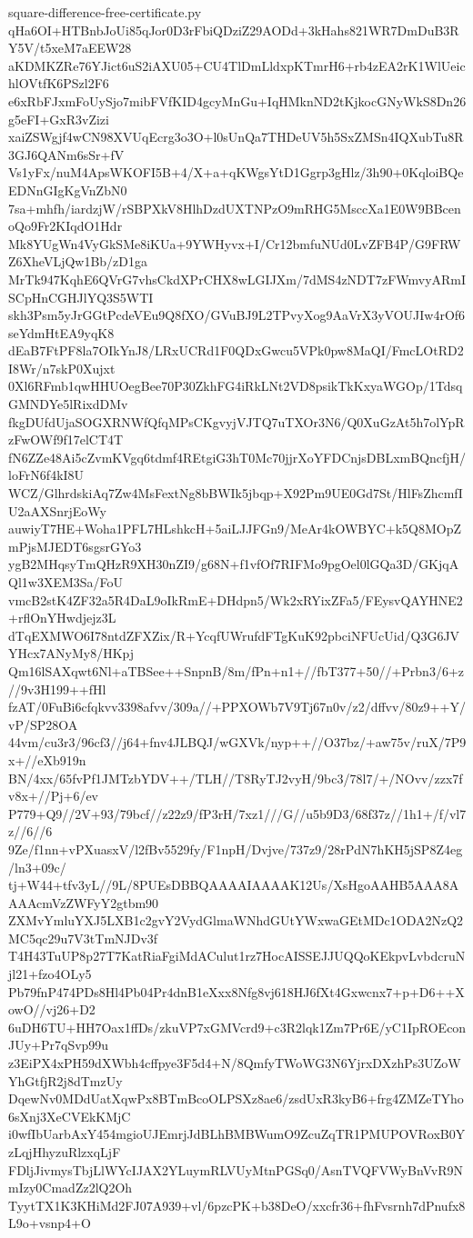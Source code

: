 \documentclass[11pt]{article}
\theoremstyle{definition}
\theoremstyle{remark}
\begin{document}
\begin{filecontents*}[overwrite]{square-difference-free-certificate.py}
qHa6OI+HTBnbJoUi85qJor0D3rFbiQDziZ29AODd+3kHahs821WR7DmDuB3RY5V/t5xeM7aEEW28
aKDMKZRe76YJict6uS2iAXU05+CU4TlDmLldxpKTmrH6+rb4zEA2rK1WlUeichlOVtfK6PSzl2F6
e6xRbFJxmFoUySjo7mibFVfKID4gcyMnGu+IqHMknND2tKjkocGNyWkS8Dn26g5eFI+GxR3vZizi
xaiZSWgjf4wCN98XVUqEcrg3o3O+l0sUnQa7THDeUV5h5SxZMSn4IQXubTu8R3GJ6QANm6sSr+fV
Vs1yFx/nuM4ApsWKOFI5B+4/X+a+qKWgsYtD1Ggrp3gHlz/3h90+0KqloiBQeEDNnGIgKgVnZbN0
7sa+mhfh/iardzjW/rSBPXkV8HlhDzdUXTNPzO9mRHG5MsccXa1E0W9BBcenoQo9Fr2KIqdO1Hdr
Mk8YUgWn4VyGkSMe8iKUa+9YWHyvx+I/Cr12bmfuNUd0LvZFB4P/G9FRWZ6XheVLjQw1Bb/zD1ga
MrTk947KqhE6QVrG7vhsCkdXPrCHX8wLGIJXm/7dMS4zNDT7zFWmvyARmISCpHnCGHJlYQ3S5WTI
skh3Psm5yJrGGtPcdeVEu9Q8fXO/GVuBJ9L2TPvyXog9AaVrX3yVOUJIw4rOf6seYdmHtEA9yqK8
dEaB7FtPF8la7OIkYnJ8/LRxUCRd1F0QDxGwcu5VPk0pw8MaQI/FmcLOtRD2I8Wr/n7skP0Xujxt
0Xl6RFmb1qwHHUOegBee70P30ZkhFG4iRkLNt2VD8psikTkKxyaWGOp/1TdsqGMNDYe5lRixdDMv
fkgDUfdUjaSOGXRNWfQfqMPsCKgvyjVJTQ7uTXOr3N6/Q0XuGzAt5h7olYpRzFwOWf9f17elCT4T
fN6ZZe48Ai5cZvmKVgq6tdmf4REtgiG3hT0Mc70jjrXoYFDCnjsDBLxmBQncfjH/loFrN6f4kI8U
WCZ/GlhrdskiAq7Zw4MsFextNg8bBWIk5jbqp+X92Pm9UE0Gd7St/HlFsZhcmfIU2aAXSnrjEoWy
auwiyT7HE+Woha1PFL7HLshkcH+5aiLJJFGn9/MeAr4kOWBYC+k5Q8MOpZmPjsMJEDT6sgsrGYo3
ygB2MHqsyTmQHzR9XH30nZI9/g68N+f1vfOf7RIFMo9pgOel0lGQa3D/GKjqAQl1w3XEM3Sa/FoU
vmcB2stK4ZF32a5R4DaL9oIkRmE+DHdpn5/Wk2xRYixZFa5/FEysvQAYHNE2+rflOnYHwdjejz3L
dTqEXMWO6I78ntdZFXZix/R+YcqfUWrufdFTgKuK92pbciNFUcUid/Q3G6JVYHcx7ANyMy8/HKpj
Qm16lSAXqwt6Nl+aTBSee++SnpnB/8m/fPn+n1+//fbT377+50//+Prbn3/6+z//9v3H199++fHl
fzAT/0FuBi6cfqkvv3398afvv/309a//+PPXOWb7V9Tj67n0v/z2/dffvv/80z9++Y/vP/SP28OA
44vm/cu3r3/96cf3//j64+fnv4JLBQJ/wGXVk/nyp++//O37bz/+aw75v/ruX/7P9x+//eXb919n
BN/4xx/65fvPf1JMTzbYDV++/TLH//T8RyTJ2vyH/9bc3/78l7/+/NOvv/zzx7fv8x+//Pj+6/ev
P779+Q9//2V+93/79bcf//z22z9/fP3rH/7xz1///G//u5b9D3/68f37z//1h1+/f/vl7z//6//6
9Ze/f1nn+vPXuasxV/l2fBv5529fy/F1npH/Dvjve/737z9/28rPdN7hKH5jSP8Z4eg/ln3+09c/
tj+W44+tfv3yL//9L/8PUEsDBBQAAAAIAAAAK12Us/XsHgoAAHB5AAA8AAAAcmVzZWFyY2gtbm90
ZXMvYmluYXJ5LXB1c2gvY2VydGlmaWNhdGUtYWxwaGEtMDc1ODA2NzQ2MC5qc29u7V3tTmNJDv3f
T4H43TuUP8p27T7KatRiaFgiMdACulut1rz7HocAISSEJJUQQoKEkpvLvbdcruNjl21+fzo4OLy5
Pb79fnP474PDs8Hl4Pb04Pr4dnB1eXxx8Nfg8vj618HJ6fXt4Gxwcnx7+p+D6++XowO//vj26+D2
6uDH6TU+HH7Oax1ffDs/zkuVP7xGMVcrd9+c3R2lqk1Zm7Pr6E/yC1IpROEconJUy+Pr7qSvp99u
z3EiPX4xPH59dXWbh4cffpye3F5d4+N/8QmfyTWoWG3N6YjrxDXzhPs3UZoWYhGtfjR2j8dTmzUy
DqewNv0MDdUatXqwPx8BTmBcoOLPSXz8ae6/zsdUxR3kyB6+frg4ZMZeTYho6sXnj3XeCVEkKMjC
i0wfIbUarbAxY454mgioUJEmrjJdBLhBMBWumO9ZcuZqTR1PMUPOVRoxB0YzLqjHhyzuRlzxqLjF
FDljJivmysTbjLlWYcIJAX2YLuymRLVUyMtnPGSq0/AsnTVQFVWyBnVvR9NmIzy0CmadZz2lQ2Oh
TyytTX1K3KHiMd2FJ07A939+vl/6pzcPK+b38DeO/xxcfr36+fhFvsrnh7dPnufx8L9o+vsnp4+O

\end{filecontents*}
\end{document}
